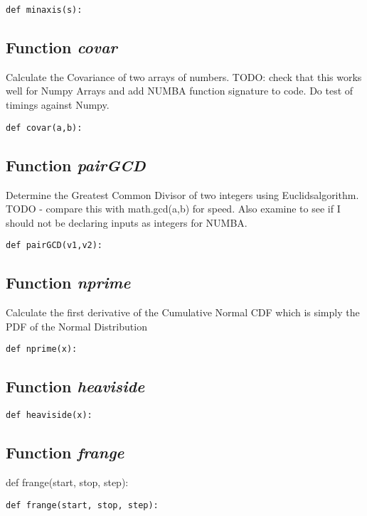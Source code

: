 \documentclass[twoside,11pt]{book}
\begin{document}
\begin{lstlisting}
def minaxis(s):
\end{lstlisting}

\subsection{Function {\it covar}}
Calculate the Covariance of two arrays of numbers. TODO: check that this works well for Numpy Arrays and add NUMBA function signature to code. Do test of timings against Numpy. 

\begin{lstlisting}
def covar(a,b):
\end{lstlisting}

\subsection{Function {\it pairGCD}}
Determine the Greatest Common Divisor of two integers using Euclidsalgorithm. TODO - compare this with math.gcd(a,b) for speed. Also examine to see if I should not be declaring inputs as integers for NUMBA. 

\begin{lstlisting}
def pairGCD(v1,v2):
\end{lstlisting}

\subsection{Function {\it nprime}}
Calculate the first derivative of the Cumulative Normal CDF which is simply the PDF of the Normal Distribution 

\begin{lstlisting}
def nprime(x):
\end{lstlisting}

\subsection{Function {\it heaviside}}


\begin{lstlisting}
def heaviside(x):
\end{lstlisting}

\subsection{Function {\it frange}}
def frange(start, stop, step):

\begin{lstlisting}
def frange(start, stop, step):
\end{lstlisting}
\end{document}
